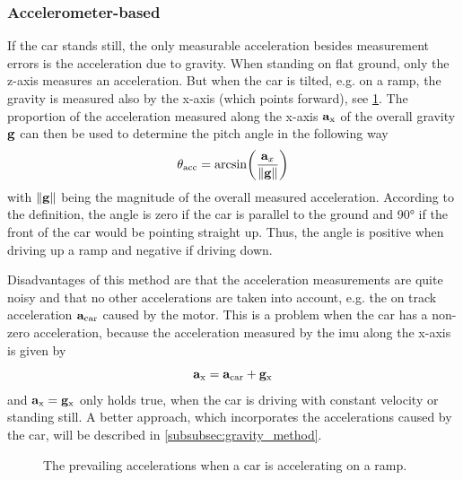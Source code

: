 \subsubsection{Accelerometer-based}
\label{ssec:linear_acceleration_only}
If the car stands still, the only measurable acceleration besides measurement errors is the acceleration due to gravity.
When standing on flat ground, only the z-axis measures an acceleration.
But when the car is tilted, e.g. on a ramp, the gravity is measured also by the x-axis (which points forward), see \cref{fig:tikz_car_gravity}.
The proportion of the acceleration measured along the x-axis $\vb{a}_\mathrm{x} $ of the overall gravity $\vb{g}$ can then be used to determine the pitch angle in the following way
\begin{equation}
    \label{eq:ang_from_acc}
    \theta_\mathrm{acc}  = \arcsin(\frac{\vb{a}_x}{\norm{\vb{g}}})
\end{equation}
with $\norm{\vb{g}}$ being the magnitude of the overall measured acceleration.
According to the definition, the angle is zero if the car is parallel to the ground and \ang{90} if the front of the car would be pointing straight up.
Thus, the angle is positive when driving up a ramp and negative if driving down.

Disadvantages of this method are that the acceleration measurements are quite noisy and that no other accelerations are taken into account, e.g. the on track acceleration $\vb{a}_\mathrm{car}$ caused by the motor.
This is a problem when the car has a non-zero acceleration, because the acceleration measured by the \gls{imu} along the x-axis is given by
\begin{equation}
    \vb{a}_\mathrm{x} = \vb{a}_\mathrm{car} + \vb{g}_\mathrm{x}
\end{equation}
and $\vb{a}_\mathrm{x} = \vb{g}_\mathrm{x} $ only holds true, when the car is driving with constant velocity or standing still.
A better approach, which incorporates the accelerations caused by the car, will be described in \cref{subsubsec:gravity_method}.
\begin{figure}[htb]
    \centering
    
    \caption[Prevailing accelerations on a ramp]{The prevailing accelerations when a car is accelerating on a ramp.}
    \label{fig:tikz_car_gravity}
\end{figure}

